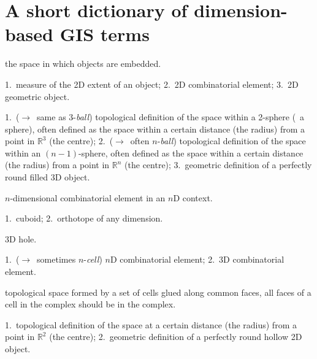 
\chapter{A short dictionary of dimension-based GIS terms}
\label{ch:dictionary}

\begin{multicols}{2}

\begin{description}
\footnotesize

\item[ambient space]
the space in which objects are embedded.

\item[area]
1.\ measure of the 2D extent of an object;
2.\ 2D combinatorial element;
{\color{gray} 3.\ 2D geometric object}.

\item[ball]
1.\ ($\rightarrow$\ same as 3-\emph{ball}) topological definition of the space within a 2-sphere (\ie\ a sphere), often defined as the space within a certain distance (the radius) from a point in $\mathbb{R}^3$ (the centre);
2.\ ($\rightarrow$\ often $n$-\emph{ball}) topological definition of the space within an $(n-1)$-sphere, often defined as the space within a certain distance (the radius) from a point in $\mathbb{R}^n$ (the centre);
3.\ geometric definition of a perfectly round filled 3D object.

\item[body]
$n$-dimensional combinatorial element in an $n$D context.

\item[box]
1.\ cuboid;
2.\ orthotope of any dimension.

\item[cavity]
3D hole.

\item[cell]
1.\ ($\rightarrow$\ sometimes $n$-\emph{cell}) $n$D combinatorial element;
{\color{gray} 2.\ 3D combinatorial element}.

\item[cell complex]
topological space formed by a set of cells glued along common faces, all faces of a cell in the complex should be in the complex.

\item[circle]
1.\ topological definition of the space at a certain distance (the radius) from a point in $\mathbb{R}^2$ (the centre);
2.\ geometric definition of a perfectly round hollow 2D object.


\end{description}
\end{multicols}
